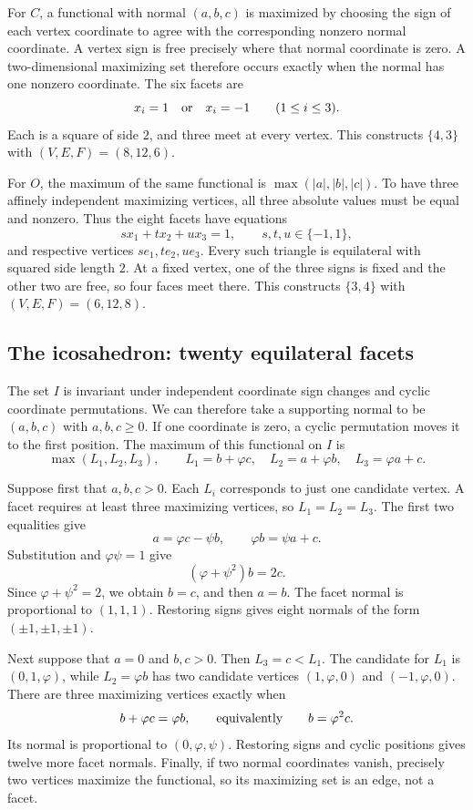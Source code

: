 For $C$, a functional with normal $(a,b,c)$ is maximized by choosing the
sign of each vertex coordinate to agree with the corresponding nonzero
normal coordinate.  A vertex sign is free precisely where that normal
coordinate is zero.  A two-dimensional maximizing set therefore occurs
exactly when the normal has one nonzero coordinate.  The six facets are
\[
 x_i=1\quad\hbox{or}\quad x_i=-1\qquad(1\le i\le3).
\]
Each is a square of side $2$, and three meet at every vertex.
This constructs $\{4,3\}$ with $(V,E,F)=(8,12,6)$.

For $O$, the maximum of the same functional is
$\max(|a|,|b|,|c|)$.  To have three affinely independent maximizing
vertices, all three absolute values must be equal and nonzero.
Thus the eight facets have equations
\[
 s x_1+t x_2+u x_3=1,
 \qquad s,t,u\in\{-1,1\},
\]
and respective vertices $s e_1,t e_2,u e_3$.
Every such triangle is equilateral with squared side length $2$.
At a fixed vertex, one of the three signs is fixed and the other two
are free, so four faces meet there.  This constructs $\{3,4\}$ with
$(V,E,F)=(6,12,8)$.

\subsection{The icosahedron: twenty equilateral facets}

The set $I$ is invariant under independent coordinate sign changes and
cyclic coordinate permutations.  We can therefore take a supporting
normal to be $(a,b,c)$ with $a,b,c\ge0$.  If one coordinate is zero,
a cyclic permutation moves it to the first position.  The maximum of
this functional on $I$ is
\begin{equation}\label{eq:ico-maxima}
 \max(L_1,L_2,L_3),\qquad
 L_1=b+\varphi c,\quad
 L_2=a+\varphi b,\quad
 L_3=\varphi a+c.
\end{equation}

Suppose first that $a,b,c>0$.  Each $L_i$ corresponds to just one
candidate vertex.  A facet requires at least three maximizing vertices,
so $L_1=L_2=L_3$.  The first two equalities give
\[
 a=\varphi c-\psi b,
 \qquad \varphi b=\psi a+c.
\]
Substitution and $\varphi\psi=1$ give
\[
 (\varphi+\psi^2)b=2c.
\]
Since $\varphi+\psi^2=2$, we obtain $b=c$, and then $a=b$.
The facet normal is proportional to $(1,1,1)$.  Restoring signs gives
eight normals of the form $(\pm1,\pm1,\pm1)$.

Next suppose that $a=0$ and $b,c>0$.  Then
$L_3=c<L_1$.  The candidate for $L_1$ is $(0,1,\varphi)$, while
$L_2=\varphi b$ has two candidate vertices $(1,\varphi,0)$ and
$(-1,\varphi,0)$.  There are three maximizing vertices exactly when
\[
 b+\varphi c=\varphi b,
 \qquad\hbox{equivalently}\qquad b=\varphi^2 c.
\]
Its normal is proportional to $(0,\varphi,\psi)$.
Restoring signs and cyclic positions gives twelve more facet normals.
Finally, if two normal coordinates vanish, precisely two vertices
maximize the functional, so its maximizing set is an edge, not a facet.

